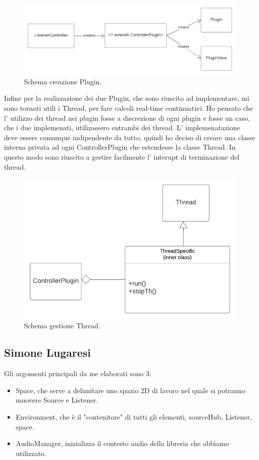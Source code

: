 \documentclass[a4paper,12pt]{report}
\begin{document}
\begin{figure}[H]
\centering{}
\includegraphics[width=\textwidth]{img/listener/PluginCreates.png}
\caption{Schema creazione Plugin.}
\label{img:Listener}
\end{figure}
%
Infine per la realizzazione dei due Plugin, che sono riuscito ad implementare, mi sono tornati utili i Thread, per fare calcoli real-time continuativi. Ho pensato che l' utilizzo dei thread nei plugin fosse a discrezione di ogni plugin e fosse un caso, che i due implemenati, utilizassero entrambi dei thread. L' implemenatazione deve essere comunque indipendente da tutto, quindi ho deciso di creare una classe interna privata ad ogni ControllerPlugin che estendesse la classe Thread. In questo modo sono riuscito a gestire facilmente l' interupt di terminazione del thread.
\begin{figure}[H]
\centering{}
\includegraphics[width=\textwidth]{img/listener/PluginThread.png}
\caption{Schema gestione Thread.}
\label{img:Listener}
\end{figure}

\subsection*{Simone Lugaresi}
Gli argomenti principali da me elaborati sono 3:
\begin{itemize}
	\item Space, che serve a delimitare uno spazio 2D di lavoro nel quale si potranno muovere Source e Listener.
	\item Environment, che è il "contenitore" di tutti gli elementi, sourceHub, Listener, space.
	\item AudioManager, inizializza il contesto audio della libreria che abbiamo utilizzato.
\end{itemize}
\end{document}

